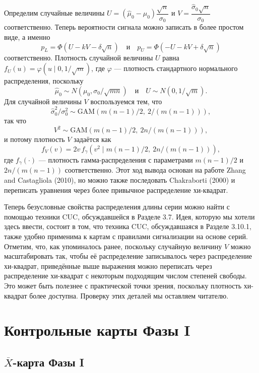 Определим случайные величины \(U = (\hat{\mu}_0 - \mu_0)\dfrac{\sqrt{n}}{\sigma_0}\) и \(V = \dfrac{\hat{\sigma}_0\sqrt{n}}{\sigma_0}\) соответственно. Теперь вероятности сигнала можно записать в более простом виде, а именно
\[
	p_L = \Phi(U - kV - \delta\sqrt{n}) \quad\text{и}\quad
	p_U = \Phi(-U - kV + \delta\sqrt{n})
\]
соответственно. Плотность случайной величины \(U\) равна \(f_U(u) = \varphi(u \mid 0, 1/\sqrt{m})\), где \(\varphi\) — плотность стандартного нормального распределения, поскольку
\[
	\hat{\mu}_0 \sim N(\mu_0, \sigma_0/\sqrt{mn}) \quad\text{и}\quad U \sim N(0, 1/\sqrt{m}).
\]
Для случайной величины \(V\) воспользуемся тем, что
\[
	\hat{\sigma}_0^2/\sigma_0^2 \sim \mathrm{GAM}(m(n - 1)/2,\ 2/(m(n - 1))),
\]
так что
\[
	V^2 \sim \mathrm{GAM}(m(n - 1)/2,\ 2n/(m(n - 1))),
\]
и потому плотность \(V\) задаётся как
\[
	f_V(v) = 2v\, f_\gamma(v^2 \mid m(n - 1)/2,\ 2n/(m(n - 1))),
\]
где \(f_\gamma(\cdot)\) — плотность гамма-распределения с параметрами \(m(n - 1)/2\) и \(2n/(m(n - 1))\) соответственно. Этот ход вывода основан на работе Zhang and Castagliola (2010), но можно также последовать Chakraborti (2000) и переписать уравнения через более привычное распределение хи-квадрат.

Теперь безусловные свойства распределения длины серии можно найти с помощью техники CUC, обсуждавшейся в Разделе 3.7. Идея, которую мы хотели здесь ввести, состоит в том, что техника CUC, обсуждавшаяся в Разделе 3.10.1, также удобно применима к картам с правилами сигнализации на основе серий. Отметим, что, как упоминалось ранее, поскольку случайную величину \(V\) можно масштабировать так, чтобы её распределение записывалось через распределение хи-квадрат, приведённые выше выражения можно переписать через распределение хи-квадрат с некоторым подходящим числом степеней свободы. Это может быть полезнее с практической точки зрения, поскольку плотность хи-квадрат более доступна. Проверку этих деталей мы оставляем читателю.

\section{Контрольные карты Фазы I}

\subsection{\(\overline{X}\)-карта Фазы I}

